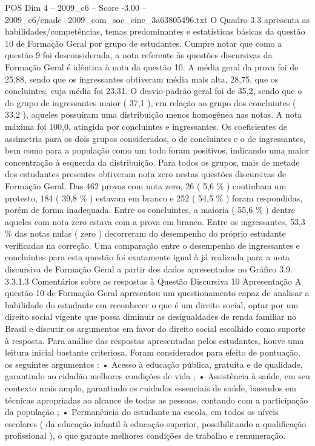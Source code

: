 \begin{textsample}{POS Dim 4 – 2009\_c6 – Score -3.00 – 2009\_c6/enade\_2009\_com\_soc\_cine\_3a63805496.txt}
O Quadro 3.3 apresenta as habilidades/competências, temas predominantes e estatísticas básicas da questão 10 de Formação Geral por grupo de estudantes.
Cumpre notar que como a questão 9 foi desconsiderada, a nota referente às questões discursivas da Formação Geral é idêntica à nota da questão 10.
A média geral da prova foi de 25,88, sendo que os ingressantes obtiveram média mais alta, 28,75, que os concluintes, cuja média foi 23,31.
O desvio-padrão geral foi de 35,2, sendo que o do grupo de ingressantes maior ( 37,1 ), em relação ao grupo dos concluintes ( 33,2 ), aqueles possuíram uma distribuição menos homogênea nas notas.
A nota máxima foi 100,0, atingida por concluintes e ingressantes.
Os coeficientes de assimetria para os dois grupos considerados, o de concluintes e o de ingressantes, bem como para a população como um todo foram positivos, indicando uma maior concentração à esquerda da distribuição.
Para todos os grupos, mais de metade dos estudantes presentes obtiveram nota zero nestas questões discursivas de Formação Geral.
Das 462 provas com nota zero, 26 ( 5,6 \% ) continham um protesto, 184 ( 39,8 \% ) estavam em branco e 252 ( 54,5 \% ) foram respondidas, porém de forma inadequada.
Entre os concluintes, a maioria ( 55,6 \% ) dentre aqueles com nota zero estava com a prova em branco.
Entre os ingressantes, 53,3 \% das notas nulas ( zero ) decorreram do desempenho do próprio estudante verificadas na correção.
Uma comparação entre o desempenho de ingressantes e concluintes para esta questão foi exatamente igual à já realizada para a nota discursiva de Formação Geral a partir dos dados apresentados no Gráfico 3.9. 3.3.1.3 Comentários sobre as respostas à Questão Discursiva 10 Apresentação A questão 10 de Formação Geral apresentou um questionamento capaz de analisar a habilidade do estudante em reconhecer o que é um direito social, optar por um direito social vigente que possa diminuir as desigualdades de renda familiar no Brasil e discutir os argumentos em favor do direito social escolhido como suporte à resposta.
Para análise das respostas apresentadas pelos estudantes, houve uma leitura inicial bastante criteriosa.
Foram considerados para efeito de pontuação, os seguintes argumentos : • Acesso à educação pública, gratuita e de qualidade, garantindo ao cidadão melhores condições de vida ; • Assistência à saúde, em seu contexto mais amplo, garantindo os cuidados essenciais de saúde, baseados em técnicas apropriadas ao alcance de todas as pessoas, contando com a participação da população ; • Permanência do estudante na escola, em todos os níveis escolares ( da educação infantil à educação superior, possibilitando a qualificação profissional ), o que garante melhores condições de trabalho e remuneração.

\end{textsample}
